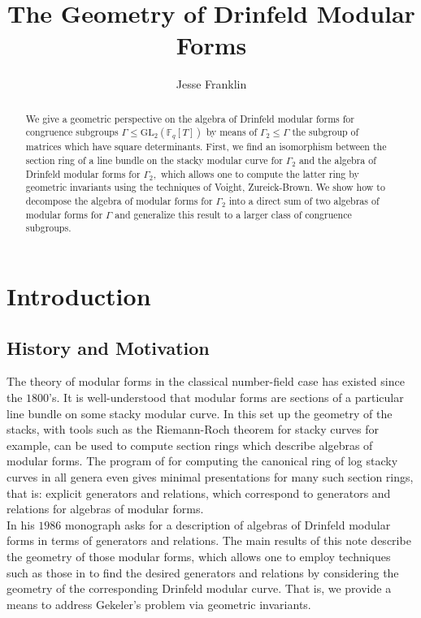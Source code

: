 \documentclass[11pt]{amsart}
\theoremstyle{definition}
\numberwithin{equation}{section}
\newcommand{\GL}{\mathrm{GL}} 	%
\newcommand{\bbF}{\mathbb{F}}		%
\begin{document}
	
\title{The Geometry of Drinfeld Modular Forms}
\author{Jesse Franklin}
	
	\begin{abstract}
			We give a geometric perspective on the algebra of Drinfeld modular forms for congruence subgroups $\Gamma\leq \GL_2(\bbF_q[T])$ by means of $\Gamma_2\leq\Gamma$ the subgroup of matrices which have square determinants. First, we find an isomorphism between the section ring of a line bundle on the stacky modular curve for $\Gamma_2$ and the algebra of Drinfeld modular forms for $\Gamma_2,$ which allows one to compute the latter ring by geometric invariants using the techniques of Voight, Zureick-Brown. We show how to decompose the algebra of modular forms for $\Gamma_2$ into a direct sum of two algebras of modular forms for $\Gamma$ and generalize this result to a larger class of congruence subgroups. 
		\end{abstract}
		\maketitle
		\tableofcontents
		
		\section{Introduction}
		
		\subsection{History and Motivation}
		The theory of modular forms in the classical number-field case has existed since the $1800$'s. It is well-understood that modular forms are sections of a particular line bundle on some stacky modular curve. In this set up the geometry of the stacks, with tools such as the Riemann-Roch theorem for stacky curves for example, can be used to compute section rings which describe algebras of modular forms. The program of \cite{VZB} for computing the canonical ring of log stacky curves in all genera even gives minimal presentations for many such section rings, that is: explicit generators and relations, which correspond to generators and relations for algebras of modular forms.\\
		
		In his $1986$ monograph \cite[Page $\mathrm{XIII}$]{Gekeler-Curves} asks for a description of algebras of Drinfeld modular forms in terms of generators and relations. The main results of this note describe the geometry of those modular forms, which allows one to employ techniques such as those in \cite{VZB} to find the desired generators and relations by considering the geometry of the corresponding Drinfeld modular curve. That is, we provide a means to address Gekeler's problem via geometric invariants.\\
		
\end{document}
